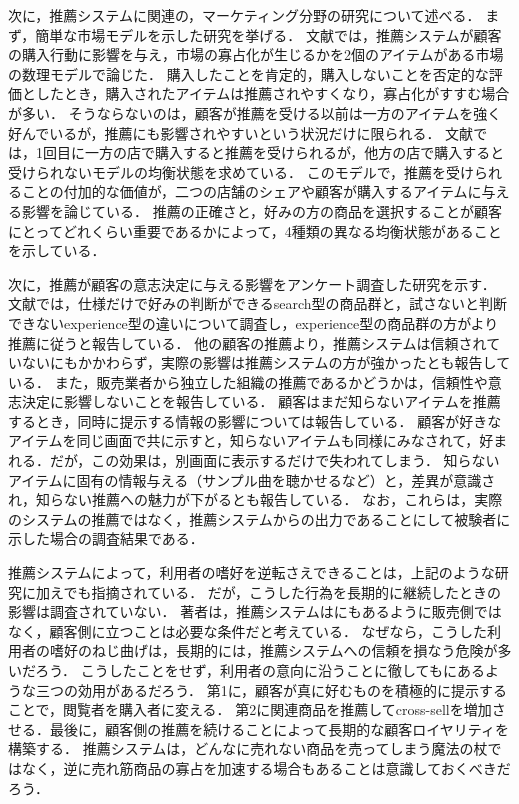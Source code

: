 次に，推薦システムに関連の，マーケティング分野の研究について述べる．
まず，簡単な市場モデルを示した研究を挙げる．
文献\cite{ec:030}では，推薦システムが顧客の購入行動に影響を与え，市場の寡占化が生じるかを2個のアイテムがある市場の数理モデルで論じた．
購入したことを肯定的，購入しないことを否定的な評価としたとき，購入されたアイテムは推薦されやすくなり，寡占化がすすむ場合が多い．
そうならないのは，顧客が推薦を受ける以前は一方のアイテムを強く好んでいるが，推薦にも影響されやすいという状況だけに限られる．
文献\cite{ec:031}では，1回目に一方の店で購入すると推薦を受けられるが，他方の店で購入すると受けられないモデルの均衡状態を求めている．
このモデルで，推薦を受けられることの付加的な価値が，二つの店舗のシェアや顧客が購入するアイテムに与える影響を論じている．
推薦の正確さと，好みの方の商品を選択することが顧客にとってどれくらい重要であるかによって，4種類の異なる均衡状態があることを示している．

次に，推薦が顧客の意志決定に与える影響をアンケート調査した研究を示す．
文献\cite{ej:053}では，仕様だけで好みの判断ができるsearch型の商品群と，試さないと判断できないexperience型の違いについて調査し，experience型の商品群の方がより推薦に従うと報告している．
他の顧客の推薦より，推薦システムは信頼されていないにもかかわらず，実際の影響は推薦システムの方が強かったとも報告している．
また，販売業者から独立した組織の推薦であるかどうかは，信頼性や意志決定に影響しないことを報告している．
顧客はまだ知らないアイテムを推薦するとき，同時に提示する情報の影響について\cite{ej:054}は報告している．
顧客が好きなアイテムを同じ画面で共に示すと，知らないアイテムも同様にみなされて，好まれる．だが，この効果は，別画面に表示するだけで失われてしまう．
知らないアイテムに固有の情報与える（サンプル曲を聴かせるなど）と，差異が意識され，知らない推薦への魅力が下がるとも報告している．
なお，これらは，実際のシステムの推薦ではなく，推薦システムからの出力であることにして被験者に示した場合の調査結果である．

推薦システムによって，利用者の嗜好を逆転さえできることは，上記のような研究に加え\cite{sigchi:03:02}でも指摘されている．
だが，こうした行為を長期的に継続したときの影響は調査されていない．
著者は，推薦システムは\cite{dmkd:01:01}にもあるように販売側ではなく，顧客側に立つことは必要な条件だと考えている．
なぜなら，こうした利用者の嗜好のねじ曲げは，長期的には，推薦システムへの信頼を損なう危険が多いだろう．
こうしたことをせず，利用者の意向に沿うことに徹しても\cite{dmkd:01:01}にあるような三つの効用があるだろう．
第1に，顧客が真に好むものを積極的に提示することで，閲覧者を購入者に変える．
第2に関連商品を推薦してcross-sellを増加させる．最後に，顧客側の推薦を続けることによって長期的な顧客ロイヤリティを構築する．
推薦システムは，どんなに売れない商品を売ってしまう魔法の杖ではなく，逆に売れ筋商品の寡占を加速する場合もあることは意識しておくべきだろう．
